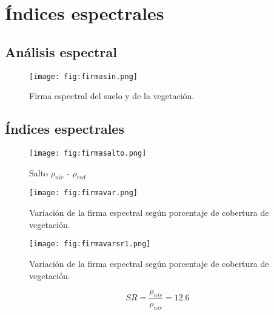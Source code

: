\section{Índices espectrales}
\subsection{Análisis espectral}

\begin{frame}{}
  \begin{figure}
    \centering
    \texttt{[image: fig:firmasin.png]}
    \caption{Firma espectral del suelo y de la vegetación.}
    \label{}
  \end{figure}
\end{frame}
\subsection{Índices espectrales}

\begin{frame}{}
  \begin{figure}
    \centering
    \texttt{[image: fig:firmasalto.png]}
    \caption{Salto $\rho_{nir}$ - $\rho_{red}$}
    \label{}
  \end{figure}
\end{frame}


\begin{frame}{}
  \begin{figure}
    \centering
    \texttt{[image: fig:firmavar.png]}
    \caption{Variación de la firma espectral según porcentaje de cobertura de vegetación.}
    \label{}
  \end{figure}
\end{frame}



\begin{frame}{}
  \begin{figure}
    \centering
    \texttt{[image: fig:firmavarsr1.png]}
    \caption{Variación de la firma espectral según porcentaje de cobertura de vegetación.}
    \label{}
  \end{figure}
\end{frame}

\begin{frame}
\begin{equation}
    SR = \frac{\rho_{nir}}{\rho_{nir}} = 12.6
  \end{equation}
  \end{frame}
  
